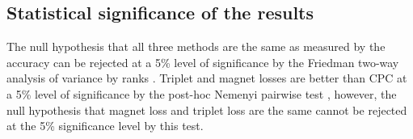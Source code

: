 \subsection{Statistical significance of the results}

The null hypothesis that all three methods are the same as measured by the accuracy can be rejected at a 5\% level of significance by the Friedman two-way analysis of variance by ranks \cite{friedman_use_1937}. Triplet and magnet losses are better than CPC at a 5\% level of significance by the post-hoc Nemenyi pairwise test \cite{nemenyi_distribution-free_1963}, however, the null hypothesis that magnet loss and triplet loss are the same cannot be rejected at the 5\% significance level by this test.
